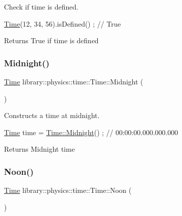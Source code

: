 Check if time is defined. 


\begin{DoxyCode}
\hyperlink{classlibrary_1_1physics_1_1time_1_1_time_a46a4b9be1451041ae65332f04db21c4b}{Time}(12, 34, 56).isDefined() ; \textcolor{comment}{// True}
\end{DoxyCode}


\begin{DoxyReturn}{Returns}
True if time is defined 
\end{DoxyReturn}
\mbox{\label{classlibrary_1_1physics_1_1time_1_1_time_a03dac8a95c9e8f64ef98c5370112b3b8}} 
\subsubsection{\texorpdfstring{Midnight()}{Midnight()}}
{\footnotesize\ttfamily \hyperlink{classlibrary_1_1physics_1_1time_1_1_time}{Time} library\+::physics\+::time\+::\+Time\+::\+Midnight (\begin{DoxyParamCaption}{ }\end{DoxyParamCaption})\hspace{0.3cm}{\ttfamily [static]}}



Constructs a time at midnight. 


\begin{DoxyCode}
\hyperlink{classlibrary_1_1physics_1_1time_1_1_time_a46a4b9be1451041ae65332f04db21c4b}{Time} time = \hyperlink{classlibrary_1_1physics_1_1time_1_1_time_a03dac8a95c9e8f64ef98c5370112b3b8}{Time::Midnight}() ; \textcolor{comment}{// 00:00:00.000.000.000}
\end{DoxyCode}


\begin{DoxyReturn}{Returns}
Midnight time 
\end{DoxyReturn}
\mbox{\label{classlibrary_1_1physics_1_1time_1_1_time_a3d67891fe71e3b5ba62c6517477e7698}} 
\subsubsection{\texorpdfstring{Noon()}{Noon()}}
{\footnotesize\ttfamily \hyperlink{classlibrary_1_1physics_1_1time_1_1_time}{Time} library\+::physics\+::time\+::\+Time\+::\+Noon (\begin{DoxyParamCaption}{ }\end{DoxyParamCaption})\hspace{0.3cm}{\ttfamily [static]}}



